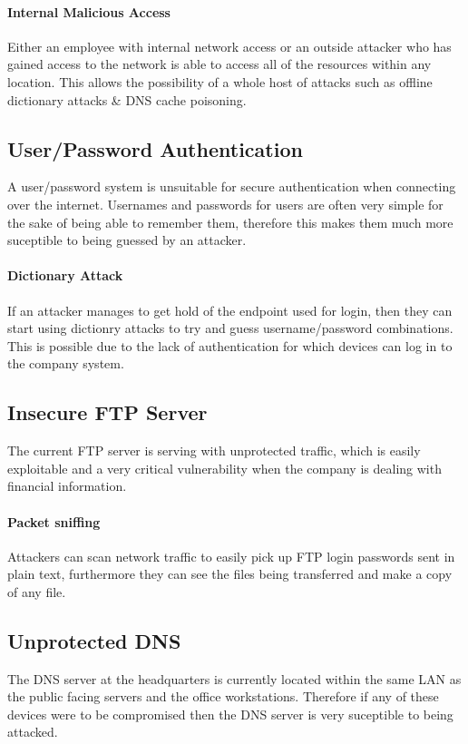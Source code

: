\documentclass[11pt]{article}
\begin{document}
      \paragraph{Internal Malicious Access}
        Either an employee with internal network access or an outside attacker who has gained access to the network is able to access all of the resources within any location. This allows the possibility of a whole host of attacks such as offline dictionary attacks \& DNS cache poisoning.

    \subsection{User/Password Authentication}
      A user/password system is unsuitable for secure authentication when connecting over the internet. Usernames and passwords for users are often very simple for the sake of being able to remember them, therefore this makes them much more suceptible to being guessed by an attacker.

      \paragraph{Dictionary Attack} %
        If an attacker manages to get hold of the endpoint used for login, then they can start using dictionry attacks to try and guess username/password combinations. This is possible due to the lack of authentication for which devices can log in to the company system.

    \subsection{Insecure FTP Server}
      The current FTP server is serving with unprotected traffic, which is easily exploitable and a very critical vulnerability when the company is dealing with financial information.

      \paragraph{Packet sniffing}
        Attackers can scan network traffic to easily pick up FTP login passwords sent in plain text, furthermore they can see the files being transferred and make a copy of any file.

    \subsection{Unprotected DNS}
      The DNS server at the headquarters is currently located within the same LAN as the public facing servers and the office workstations. Therefore if any of these devices were to be compromised then the DNS server is very suceptible to being attacked.
\end{document}
